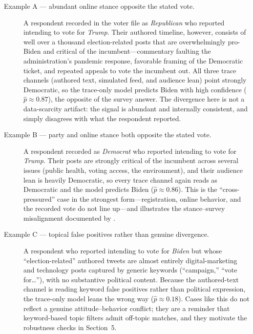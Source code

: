 
\begin{description}

\item[Example A — abundant online stance opposite the stated vote.]
A respondent recorded in the voter file as \emph{Republican} who reported intending to vote for
\emph{Trump}. Their authored timeline, however, consists of well over a thousand election-related
posts that are overwhelmingly pro-Biden and critical of the incumbent---commentary faulting the
administration's pandemic response, favorable framing of the Democratic ticket, and repeated
appeals to vote the incumbent out. All three trace channels (authored text, simulated feed, and
audience lean) point strongly Democratic, so the trace-only model predicts Biden with high
confidence ($\hat p \approx 0.87$), the opposite of the survey answer. The divergence here is not
a data-scarcity artifact: the signal is abundant and internally consistent, and simply disagrees
with what the respondent reported.

\item[Example B — party and online stance both opposite the stated vote.]
A respondent recorded as \emph{Democrat} who reported intending to vote for \emph{Trump}. Their
posts are strongly critical of the incumbent across several issues (public health, voting access,
the environment), and their audience lean is heavily Democratic, so every trace channel again
reads as Democratic and the model predicts Biden ($\hat p \approx 0.86$). This is the ``cross-
pressured'' case in the strongest form---registration, online behavior, and the recorded vote do
not line up---and illustrates the stance--survey misalignment documented by \citet{joseph2021}.

\item[Example C — topical false positives rather than genuine divergence.]
A respondent who reported intending to vote for \emph{Biden} but whose ``election-related''
authored tweets are almost entirely digital-marketing and technology posts captured by generic
keywords (``campaign,'' ``vote for\dots''), with no substantive political content. Because the
authored-text channel is reading keyword false positives rather than political expression, the
trace-only model leans the wrong way ($\hat p \approx 0.18$). Cases like this do not reflect a
genuine attitude--behavior conflict; they are a reminder that keyword-based topic filters admit
off-topic matches, and they motivate the robustness checks in Section~5.

\end{description}
